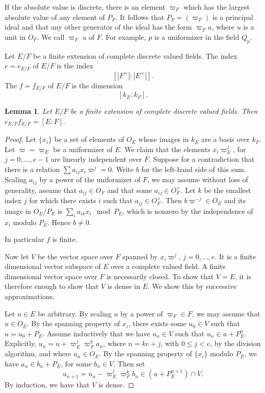 \documentclass{amsart}
\newtheorem{lemma}[equation]{Lemma}
\def\abs#1{{|#1|}}
\begin{document}
If the absolute value is discrete, there is an element $\varpi_F$ which
has the largest absolute value of any element of $P_F$.  It follows
that $P_F = (\varpi_F)$ is a principal ideal and that any other generator
of the ideal has the form $\varpi_F u$, where $u$ is a unit in $O_F$.  We
call $\varpi_F$ a  of $F$.  For example, $p$ is a
uniformizer in the field $\ring{Q}_p$.

Let $E/F$ be a finite extension of complete discrete valued fields.
The  index $e=e_{E/F}$ of $E/F$ is the index
\[
[\abs{F^\times}:\abs{E^\times}].
\]
The  $f=f_{E/F}$ of $E/F$ is the dimension
\[
[k_E:k_F].
\]



\begin{lemma} Let $E/F$ be a finite extension of complete discrete valued fields.
Then $e_{E/F} f_{E/F} = [E:F]$.
\end{lemma}

\begin{proof} Let $\{x_i\}$ be a set of elements of $O_E$ whose images
  in $k_E$ are a basis over $k_F$.  Let $\varpi=\varpi_E$ be a
  uniformizer of $E$.  We claim that the elements $x_i\varpi^j_E$, for
  $j=0,\ldots,e-1$ are linearly independent over $F$.  Suppose for a
  contradiction that there is a relation $\sum a_{ij} x_i \varpi^j=0$.
  Write $b$ for the left-hand side of this sum.  Scaling $a_{ij}$ by a
  power of the uniformizer of $F$, we may assume without loss of
  generality, assume that $a_{ij}\in O_F$ and that some $a_{ij}\in
  O_F^\times$.  Let $k$ be the smallest index $j$ for which there
  exists $i$ such that $a_{ij}\in O_F^\times$.  Then $b \varpi^{-j} \in
  O_E$ and its image in $O_E/P_E$ is $\sum_i a_{ik} x_i \mod
  P_E$, which is nonzero by the independence of $x_i$ modulo $P_E$.
  Hence $b\ne 0$.

  In particular $f$ is finite.  

  Now let $V$ be the vector space over $F$ spanned by $x_i\varpi^j$, $j=0,\ldots, e$.
  It is a finite dimensional vector subspace of $E$
  over a complete valued field.  A finite dimensional vector space over $F$ is necessarily
  closed.  To show that $V=E$, it is therefore enough to show that $V$ is dense in $E$.
  We show this by successive approximations.

  Let $u\in E$ be arbitrary. By scaling $u$ by a power of $\varpi_F\in
  F$, we may assume that $u\in O_E$.  By the spanning property of
  $x_i$, there exists some $u_0 \in V$ such that $u = u_0 + P_E$.
  Assume inductively that we have $u_n\in V$ such that $u_n \in u +
  P_E^n$.  Explicitly, $u_n = u + \varpi_E^j\varpi_F^k a_n$, where $n = k e +j$, with $0\le j<e$, 
  by the division
  algorithm, and where $a_n \in O_E$.  By the spanning property of $\{x_i\}$ modulo $P_E$,
  we have $a_n \in b_n + P_E$, for some $b_n\in V$.  Then set
  \[
  u_{n+1} = u_n - \varpi_E^j\varpi_F^k b_n \in (u + P_E^{n+1}) \cap V.
  \]
  By induction, we have that $V$ is dense.
\end{proof}
\end{document}
